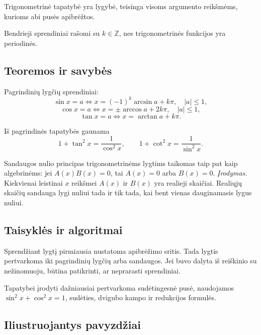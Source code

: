 \begin{apibreztis}
Trigonometrinė tapatybė yra lygybė, teisinga visoms argumento reikšmėms, kurioms abi pusės apibrėžtos.
\end{apibreztis}

\begin{pastaba}
Bendrieji sprendiniai rašomi su $k\in\mathbb{Z}$, nes trigonometrinės funkcijos yra periodinės.
\end{pastaba}

\subsection{Teoremos ir savybės}

\begin{savybe}
Pagrindinių lygčių sprendiniai:
\[
\sin x=a \iff x=(-1)^k\arcsin a+k\pi,\quad |a|\le1,
\]
\[
\cos x=a \iff x=\pm\arccos a+2k\pi,\quad |a|\le1,
\]
\[
\tan x=a \iff x=\arctan a+k\pi.
\]
\end{savybe}

\begin{savybe}
Iš pagrindinės tapatybės gaunama
\[
1+\tan^2 x=\frac{1}{\cos^2 x},\qquad 1+\cot^2 x=\frac{1}{\sin^2 x}.
\]
\end{savybe}

\begin{teorema}
Sandaugos nulio principas trigonometrinėms lygtims taikomas taip pat kaip algebrinėms: jei $A(x)B(x)=0$, tai $A(x)=0$ arba $B(x)=0$.
\emph{Įrodymas.} Kiekvienai leistinai $x$ reikšmei $A(x)$ ir $B(x)$ yra realieji skaičiai. Realiųjų skaičių sandauga lygi nuliui tada ir tik tada, kai bent vienas dauginamasis lygus nuliui.
\end{teorema}

\subsection{Taisyklės ir algoritmai}

Sprendžiant lygtį pirmiausia nustatoma apibrėžimo sritis. Tada lygtis pertvarkoma iki pagrindinių lygčių arba sandaugos. Jei buvo dalyta iš reiškinio su nežinomuoju, būtina patikrinti, ar neprarasti sprendiniai.

Tapatybei įrodyti dažniausiai pertvarkoma sudėtingesnė pusė, naudojamos $\sin^2x+\cos^2x=1$, sudėties, dvigubo kampo ir redukcijos formulės.

\subsection{Iliustruojantys pavyzdžiai}


